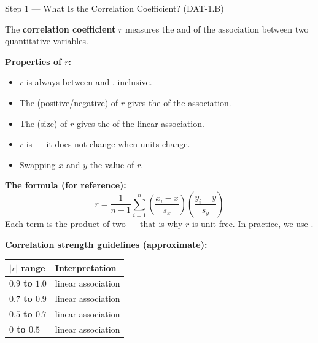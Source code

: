 \documentclass[10pt]{article}
\begin{document}
\vspace{0.08in}

\begin{notesbox}{Step 1 --- What Is the Correlation Coefficient? (DAT-1.B)}
\small

\noindent The \textbf{correlation coefficient} $r$ measures the  and 
of the  association between two quantitative variables.

\vspace{8pt}
\textbf{Properties of $r$:}
\begin{itemize}[leftmargin=1.5em, itemsep=3pt]
  \item $r$ is always between  and , inclusive.
  \item The  (positive/negative) of $r$ gives the  of the association.
  \item The  (size) of $r$ gives the  of the linear association.
  \item $r$ is  --- it does not change when units change.
  \item Swapping $x$ and $y$  the value of $r$.
\end{itemize}

\vspace{8pt}
\textbf{The formula (for reference):}
\[
  r = \frac{1}{n-1}\sum_{i=1}^{n}\left(\frac{x_i - \bar{x}}{s_x}\right)\!\left(\frac{y_i - \bar{y}}{s_y}\right)
\]
Each term is the product of two  --- that is why $r$ is unit-free.
In practice, we use .

\vspace{8pt}
\textbf{Correlation strength guidelines (approximate):}

\vspace{4pt}
\renewcommand{\arraystretch}{1.4}
\begin{tabularx}{\linewidth}{@{} >{\bfseries}C{2.5cm} X @{}}
$|r|$ range & Interpretation \\
\midrule
$0.9$ to $1.0$ &  linear association \\
$0.7$ to $0.9$ &  linear association \\
$0.5$ to $0.7$ &  linear association \\
$0$ to $0.5$   &  linear association \\
\end{tabularx}
\end{notesbox}
\end{document}
